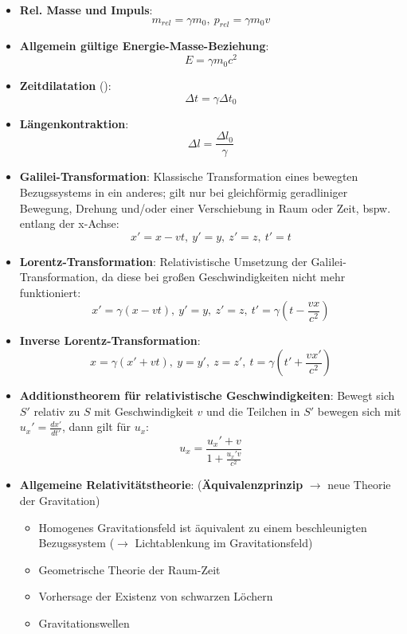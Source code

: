 \begin{itemize}
\begin{equation}
	\end{equation}
	\item \textbf{Rel. Masse und Impuls}:
	\begin{equation}
		m_{rel} = \gamma m_0,\ p_{rel} = \gamma m_0v
	\end{equation}
	\item \textbf{Allgemein gültige Energie-Masse-Beziehung}:
	\begin{equation}
		E = \gamma m_0 c^2
	\end{equation}
	\item \textbf{Zeitdilatation} ():
	\begin{equation}
		\Delta t = \gamma \Delta t_0
	\end{equation}
	\item \textbf{Längenkontraktion}:
	\begin{equation}
		\Delta l = \frac{\Delta l_0}{\gamma}
	\end{equation}
	\item \textbf{Galilei-Transformation}: Klassische Transformation eines bewegten Bezugssystems in ein anderes; gilt nur bei gleichförmig geradliniger Bewegung, Drehung und/oder einer Verschiebung in Raum oder Zeit, bspw. entlang der x-Achse:
	\begin{equation}
		x' = x - vt,\ y' = y,\ z' = z,\ t' = t
	\end{equation}
	\item \textbf{Lorentz-Transformation}: Relativistische Umsetzung der Galilei-Transformation, da diese bei großen Geschwindigkeiten nicht mehr funktioniert:
	\begin{equation}
		x' = \gamma(x - vt),\ y' = y,\ z' = z,\ t' = \gamma(t - \frac{vx}{c^2})
	\end{equation}
	\item \textbf{Inverse Lorentz-Transformation}:
	\begin{equation}
		x = \gamma(x' + vt),\ y = y',\ z = z',\ t = \gamma(t' + \frac{vx'}{c^2})
	\end{equation}
	\item \textbf{Additionstheorem für relativistische Geschwindigkeiten}: Bewegt sich $S'$ relativ zu $S$ mit Geschwindigkeit $v$ und die Teilchen in $S'$ bewegen sich mit $u_x' = \frac{dx'}{dt'}$, dann gilt für $u_x$:
	\begin{equation}
		u_x = \frac{u_x' + v}{1 + \frac{u_x'v}{c^2}}
	\end{equation}
	\item \textbf{Allgemeine Relativitätstheorie}:  (\textbf{Äquivalenzprinzip} $\rightarrow$ neue Theorie der Gravitation)
	\begin{itemize} 
		\item Homogenes Gravitationsfeld ist äquivalent zu einem beschleunigten Bezugssystem ($\rightarrow$ Lichtablenkung im Gravitationsfeld)
		\item Geometrische Theorie der Raum-Zeit
		\item Vorhersage der Existenz von schwarzen Löchern
		\item Gravitationswellen
	\end{itemize}
\end{itemize}